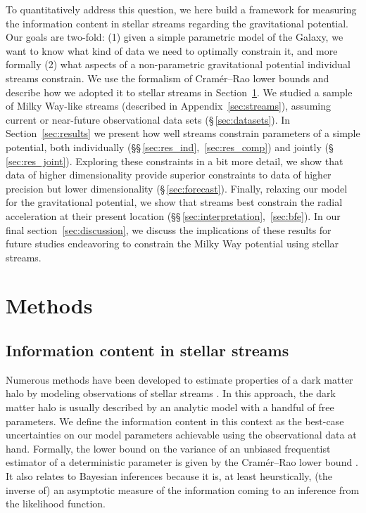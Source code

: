 \documentclass[modern]{aastex61}
\newcommand{\acronym}[1]{{\small{#1}}}
\newcommand{\CRLB}{\acronym{CRLB}}
\begin{document}
To quantitatively address this question, we here build a framework for measuring the information content in stellar streams regarding the gravitational potential.
Our goals are two-fold: (1) given a simple parametric model of the Galaxy, we want to know what kind of data we need to optimally constrain it, and more formally (2) what aspects of a non-parametric gravitational potential individual streams constrain.
We use the formalism of Cram\'er--Rao lower bounds and describe how we adopted it to stellar streams in Section~\ref{sec:method}.
We studied a sample of Milky Way-like streams (described in Appendix~\ref{sec:streams}), assuming current or near-future observational data sets (\S\,\ref{sec:datasets}).
In Section~\ref{sec:results} we present how well streams constrain parameters of a simple potential, both individually (\S\S\,\ref{sec:res_ind},~\ref{sec:res_comp}) and jointly (\S\,\ref{sec:res_joint}).
Exploring these constraints in a bit more detail, we show that data of higher dimensionality provide superior constraints to data of higher precision but lower dimensionality (\S\,\ref{sec:forecast}).
Finally, relaxing our model for the gravitational potential, we show that streams best constrain the radial acceleration at their present location (\S\S\,\ref{sec:interpretation},~\ref{sec:bfe}).
In our final section~\ref{sec:discussion}, we discuss the implications of these results for future studies endeavoring to constrain the Milky Way potential using stellar streams.


\section{Methods}
\label{sec:method}

\subsection{Information content in stellar streams}
Numerous methods have been developed to estimate properties of a dark matter halo by modeling observations of stellar streams \citep[e.g.,][]{}.
In this approach, the dark matter halo is usually described by an analytic model with a handful of free parameters.
We define the information content in this context as the best-case uncertainties on our model parameters achievable using the observational data at hand.
Formally, the lower bound on the variance of an unbiased frequentist estimator of a deterministic parameter is given by the Cram\' er--Rao lower bound \citep[\CRLB,][]{Cramer1946, Rao1945}.
It also relates to Bayesian inferences because it is, at least heurstically, (the inverse of) an asymptotic measure of the information coming to an inference from the likelihood function.
\end{document}
